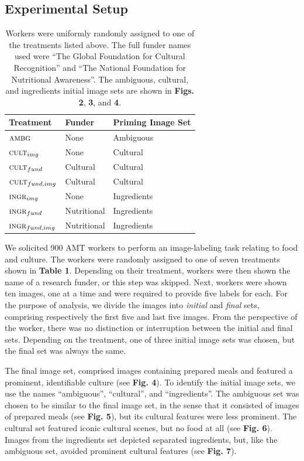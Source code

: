 \documentclass[letterpaper]{article}
\begin{document}
\subsection*{Experimental Setup}
\begin{table}[t]
\centering
	\begin{tabular}{ l  l  l }
		\hline                       
		Treatment & Funder & Priming Image Set	\\ 
		\hline                       
		$\textsc{ambg}$ & None & Ambiguous\\
		$\textsc{cult}_{img}$ & None & Cultural\\
		$\textsc{cult}_{fund}$ & Cultural & Cultural\\
		$\textsc{cult}_{fund,img}$ & Cultural & Cultural\\
		$\textsc{ingr}_{img}$ & None & Ingredients\\
		$\textsc{ingr}_{fund}$ & Nutritional & Ingredients\\
		$\textsc{ingr}_{fund, img}$ & Nutritional & Ingredients\\
		\hline  
	\end{tabular}


	\caption{ \footnotesize{ 
		Workers were uniformly randomly assigned to one of the 
		treatments listed above. 
		The full funder names used were 
		``The Global Foundation for Cultural Recognition'' and 
		``The National Foundation for Nutritional Awareness''.  
		The ambiguous, cultural, and ingredients initial image sets are shown 
		in \textbf{Figs. 2}, \textbf{3}, and \textbf{4}.
	}}
	\label{table:1}
\end{table}
We solicited 900 AMT workers to perform an image-labeling task relating to
food and culture.  The workers were randomly assigned to one of seven 
treatments shown in \textbf{Table 1}.  Depending on their treatment, workers were then shown the 
name of a research funder, or this step was skipped.
Next, workers were shown ten images, one at a time and were required to provide
five labels for each.  For the purpose of analysis, we divide the images
into \textit{initial} and \textit{final} sets, comprising respectively the 
first five and last five images.  From the perspective of the worker, there 
was no distinction or interruption between the initial and final sets. 
Depending on the treatment, one of three initial image sets was chosen, but
the final set was always the same.

The final image set, comprised images containing prepared meals and featured a 
prominent, identifiable culture (see \textbf{Fig. 4}).
To identify the initial image sets, we use the names ``ambiguous'', 
``cultural'', and ``ingredients''.  The ambiguous set was chosen to
be similar to the final image set, in the sense that it consisted of
images of prepared meals (see \textbf{Fig. 5}),  but its cultural 
features were less prominent.  The cultural set featured 
iconic cultural scenes, but no food at all (see \textbf{Fig. 6}).  Images from 
the ingredients set depicted separated ingredients, but, 
like the ambiguous set, avoided prominent cultural features (see 
\textbf{Fig. 7}).
\end{document}
